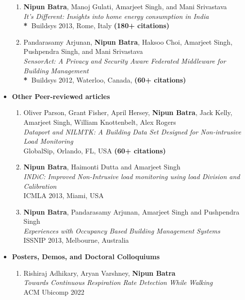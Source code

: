 \documentclass[letter,10pt]{article}
\begin{document}
\begin{itemize}
\begin{enumerate}
	\item 
	{\textbf{Nipun Batra}, Manoj Gulati, Amarjeet Singh, and Mani Srivastava}\\
	\textit{It's Different: Insights into home energy consumption in India}\\
    \textbf{*~}{Buildsys 2013, Rome, Italy \textbf{(180+ citations)}}
   
   \item 
   		{Pandarasamy Arjunan, \textbf{Nipun Batra}, Haksoo Choi, Amarjeet Singh, Pushpendra Singh, and Mani Srivastava} \\
   		\textit{SensorAct: A Privacy and Security Aware Federated Middleware for Building Management}\\
	 \textbf{*~}{Buildsys 2012, Waterloo, Canada, \textbf{(60+ citations)}}	
		
	
    \end{enumerate}
    
    \item[]\textbf{Other Peer-reviewed articles}
    \begin{enumerate}
        \item
        {Oliver Parson, Grant Fisher, April Hersey, \textbf{Nipun Batra}, Jack Kelly, Amarjeet Singh, William Knottenbelt, Alex Rogers}\\
        \textit{Dataport and NILMTK: A Building Data Set Designed for Non-intrusive Load Monitoring}\\
		{GlobalSip, Orlando, FL, USA} {\textbf{(60+ citations)}}
		
		\item 
				{\textbf{Nipun Batra}, Haimonti Dutta and Amarjeet Singh} \\
		\textit{INDiC: Improved Non-Intrusive load monitoring using load Division and Calibration} \\
		{ICMLA 2013, Miami, USA}
		
		\item 
		{\textbf{Nipun Batra}, Pandarasamy Arjunan, Amarjeet Singh and Pushpendra Singh}\\
		\textit{Experiences with Occupancy Based Building Management Systems} \\
		{ISSNIP 2013, Melbourne, Australia}
    \end{enumerate}
    
     \item[]\textbf{Posters, Demos, and Doctoral Colloquiums}
    \begin{enumerate}


\item Rishiraj Adhikary, Aryan Varshney, \textbf{Nipun Batra} \\
\textit{Towards Continuous Respiration Rate Detection
While Walking}\\
ACM Ubicomp 2022
    

\end{enumerate}
\end{itemize}
\end{document}
